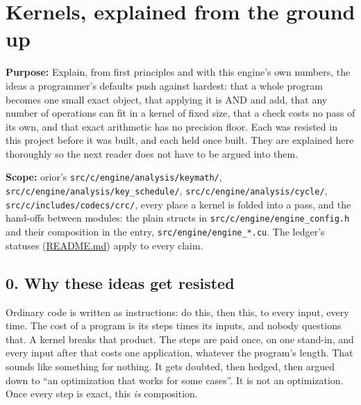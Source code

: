 \chapter{\texorpdfstring{Kernels, explained from the ground up}{Kernels, explained from the ground up}}
\label{chap:keys-explained}

\textbf{Purpose:} Explain, from first principles and with this engine's own numbers, the ideas a programmer's defaults push against hardest: that a whole program becomes one small exact object, that applying it is AND and add, that any number of operations can fit in a kernel of fixed size, that a check costs no pass of its own, and that exact arithmetic has no precision floor. Each was resisted in this project before it was built, and each held once built. They are explained here thoroughly so the next reader does not have to be argued into them.

\textbf{Scope:} orior's \texttt{src/\allowbreak{}c/\allowbreak{}engine/\allowbreak{}analysis/\allowbreak{}keymath/\allowbreak{}}, \texttt{src/\allowbreak{}c/\allowbreak{}engine/\allowbreak{}analysis/\allowbreak{}key\_\allowbreak{}schedule/\allowbreak{}}, \texttt{src/\allowbreak{}c/\allowbreak{}engine/\allowbreak{}analysis/\allowbreak{}cycle/\allowbreak{}}, \texttt{src/\allowbreak{}c/\allowbreak{}includes/\allowbreak{}codecs/\allowbreak{}crc/\allowbreak{}}, every place a kernel is folded into a pass, and the hand-offs between modules: the plain structs in \texttt{src/\allowbreak{}c/\allowbreak{}engine/\allowbreak{}engine\_\allowbreak{}config.\allowbreak{}h} and their composition in the entry, \texttt{src/\allowbreak{}engine/\allowbreak{}engine\_\allowbreak{}*.\allowbreak{}cu}. The ledger's statuses (\hyperref[chap:readme]{README.md}) apply to every claim.

\section{\texorpdfstring{0. Why these ideas get resisted}{0. Why these ideas get resisted}}

Ordinary code is written as instructions: do this, then this, to every input, every time. The cost of a program is its steps times its inputs, and nobody questions that. A kernel breaks that product. The steps are paid once, on one stand-in, and every input after that costs one application, whatever the program's length. That sounds like something for nothing. It gets doubted, then hedged, then argued down to “an optimization that works for some cases”. It is not an optimization. Once every step is exact, this \emph{is} composition.

